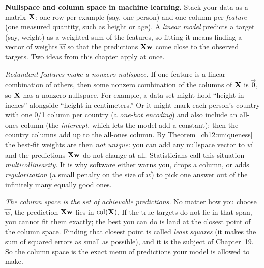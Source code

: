 \begin{applicationbox}
\textbf{Nullspace and column space in machine learning.} Stack your data as a
matrix $\mathbf{X}$: one row per example (say, one person) and one column per
\emph{feature} (one measured quantity, such as height or age). A \emph{linear
model} predicts a target (say, weight) as a weighted sum of the features, so
fitting it means finding a vector of weights $\vec{w}$ so that the predictions
$\mathbf{X}\mathbf{w}$ come close to the observed targets. Two
ideas from this chapter apply at once.

\emph{Redundant features make a nonzero nullspace.} If one feature is a linear
combination of others, then some nonzero combination of the columns of
$\mathbf{X}$ is $\vec{0}$, so $\mathbf{X}$ has a nonzero nullspace. For example, a
data set might hold ``height in inches'' alongside ``height in centimeters.''
Or it might mark each person's country with one 0/1 column per country (a
\emph{one-hot encoding}) and also include an all-ones column (the
\emph{intercept}, which lets the model add a constant); then the country
columns add up to the all-ones column. By
Theorem~\ref{ch12:uniqueness} the best-fit weights are then \emph{not unique}:
you can add any nullspace vector to $\vec{w}$ and the predictions
$\mathbf{X}\mathbf{w}$ do not change at all. Statisticians call this situation
\emph{multicollinearity}. It is why software either warns you, drops a
column, or adds \emph{regularization} (a small penalty on the size of $\vec{w}$)
to pick one answer out of the infinitely many equally good ones.

\emph{The column space is the set of achievable predictions.} No matter how you
choose $\vec{w}$, the prediction $\mathbf{X}\mathbf{w}$ lies in $\operatorname{col}(\mathbf{X})$. If the
true targets do not lie in that span, you cannot fit them exactly; the
best you can do is land at the closest point of the column space. Finding that
closest point is called \emph{least squares} (it makes the sum of squared
errors as small as possible), and it is the subject of Chapter~19. So the
column space is the exact menu of predictions
your model is allowed to make.
\end{applicationbox}

